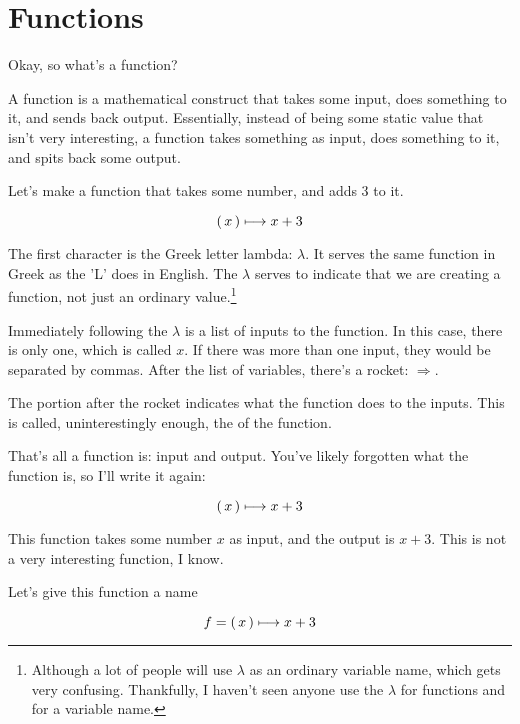 \section{Functions}

Okay, so what's a function?

A function is a mathematical construct that takes some input, does something to
it, and sends back output. Essentially, instead of being some static value that
isn't very interesting, a function takes something as input, does something to
it, and spits back some output.

Let's make a function that takes some number, and adds 3 to it.

\begin{equation}
    \left(\, x \,\right) \longmapsto x + 3
\end{equation}


The first character is the Greek letter lambda: $\lambda$. It serves the same
function in Greek as the 'L' does in English. The $\lambda$ serves to indicate
that we are creating a function, not just an ordinary value.\footnote{Although a
  lot of people will use $\lambda$ as an ordinary variable name, which gets very
  confusing. Thankfully, I haven't seen anyone use  the $\lambda$ for
  functions and for a variable name.}

Immediately following the $\lambda$ is a list of inputs to the function. In this
case, there is only one, which is called $x$. If there was more than one input,
they would be separated by commas. After the list of variables, there's a
rocket: $\Longrightarrow$.

The portion after the rocket indicates what the function does to the
inputs. This is called, uninterestingly enough, the  of the
function.

That's all a function is: input and output. You've likely forgotten what the
function is, so I'll write it again:

\begin{equation}
    \left(\, x \,\right) \longmapsto x + 3
\end{equation}

This function takes some number $x$ as input, and the output is $x + 3$. This is
not a very interesting function, I know.

Let's give this function a name

\begin{equation}
    f = \left(\, x \,\right) \longmapsto x + 3
\end{equation}

